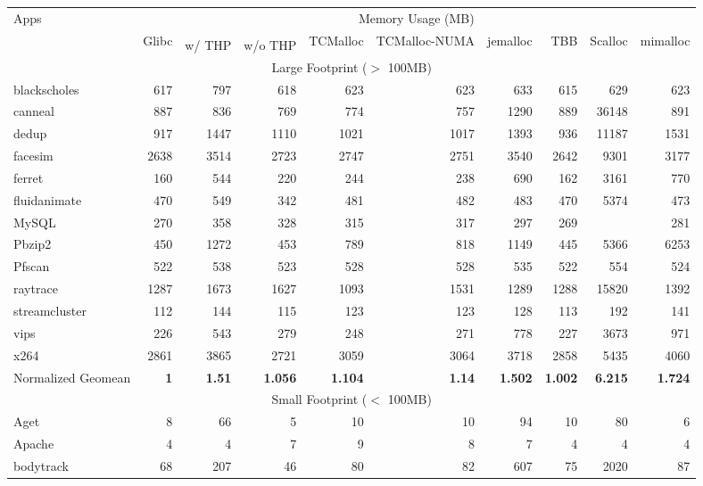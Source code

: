 \begin{table*}[tp]
\footnotesize
  \centering
    \begin{tabular}{|l|r|rr|rrrrrr|}
    \hline
    \multirow{3}{*}{Apps}&
    \multicolumn{9}{c|}{Memory Usage (MB)}\\
    \cline{2-10}
    &\multirow{2}{*}{Glibc}&\multicolumn{2}{c|}{\NM{}}&\multirow{2}{*}{TCMalloc}&\multirow{2}{*}{TCMalloc-NUMA}&\multirow{2}{*}{jemalloc}&\multirow{2}{*}{TBB}&\multirow{2}{*}{Scalloc}&\multirow{2}{*}{mimalloc} \\ \cline{3-4} 
    && w/ THP & w/o THP &&&&&& \\ \hline
    \hline
    \multicolumn{10}{|c|}{Large Footprint ($>$ 100MB)}\\ \hline
    blackscholes&617&797&618&623&623&633&615&629&623\\ \hline
canneal&887&836&769&774&757&1290&889&36148&891\\ \hline
dedup&917&1447&1110&1021&1017&1393&936&11187&1531\\ \hline
facesim&2638&3514&2723&2747&2751&3540&2642&9301&3177\\ \hline
ferret&160&544&220&244&238&690&162&3161&770\\ \hline
fluidanimate&470&549&342&481&482&483&470&5374&473\\ \hline
MySQL&270&358&328&315&317&297&269&&281\\ \hline
Pbzip2&450&1272&453&789&818&1149&445&5366&6253\\ \hline
Pfscan&522&538&523&528&528&535&522&554&524\\ \hline
raytrace&1287&1673&1627&1093&1531&1289&1288&15820&1392\\ \hline
streamcluster&112&144&115&123&123&128&113&192&141\\ \hline
vips&226&543&279&248&271&778&227&3673&971\\ \hline
x264&2861&3865&2721&3059&3064&3718&2858&5435&4060\\ \hline
\hline
Normalized Geomean &{\bf 1}&{\bf 1.51}&{\bf 1.056}&{\bf 1.104}&{\bf 1.14}&{\bf 1.502}&{\bf 1.002}&{\bf 6.215}&{\bf 1.724}\\ \hline
\multicolumn{10}{|c|}{Small Footprint ($<$ 100MB)}\\ \hline
Aget&8&66&5&10&10&94&10&80&6\\ \hline
Apache&4&4&7&9&8&7&4&4&4\\ \hline
bodytrack&68&207&46&80&82&607&75&2020&87\\ \hline

\end{tabular}
\end{table*}
